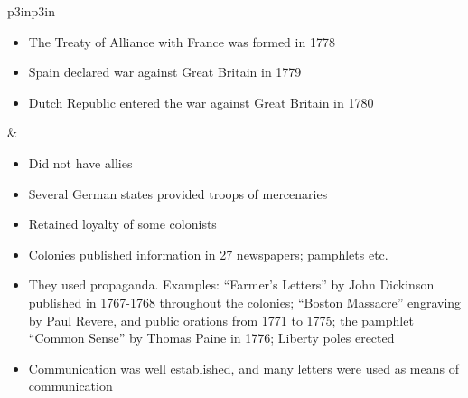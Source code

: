 
\begin{singlespace}
  \footnotesize
\begin{mpxtabular}{p{3in}p{3in}}%
  \ML
  \begin{itemize}[nolistsep,leftmargin=*]
    \item The Treaty of Alliance with France was formed in 1778
    \item Spain declared war against Great Britain in 1779 
    \item Dutch Republic entered the war against Great Britain in 1780 \cite[85,89]{stewart_2005}
  \end{itemize}
  &
  \begin{itemize}[nolistsep,leftmargin=*]
      \item  Did not have allies
      \item  Several German states provided troops of
	mercenaries \cite[62]{stewart_2005}
      \item  Retained loyalty of some colonists
  \end{itemize}\ML
  \ML
	\begin{itemize}[nolistsep,leftmargin=*]
	    \item  Colonies published information in 27 newspapers; pamphlets
	      etc. \cite[49,199]{knollenberg_growth_2003}
	    \item  They used propaganda.  Examples: ``Farmer's Letters'' by John
	      Dickinson published in 1767-1768 throughout the colonies; “Boston
	      Massacre” engraving by Paul Revere, and public orations from 1771
	      to 1775; the pamphlet “Common Sense” by Thomas Paine in 1776;
	      Liberty poles
	      erected \cite[3,48-53,81,227]{knollenberg_growth_2003} \cite[101]{ladenburg_causes_1989}
	    \item  Communication was well established, and many letters were
	      used as means of communication \cite[167,264]{knollenberg_growth_2003}

\end{itemize}
\end{mpxtabular}
\end{singlespace}
